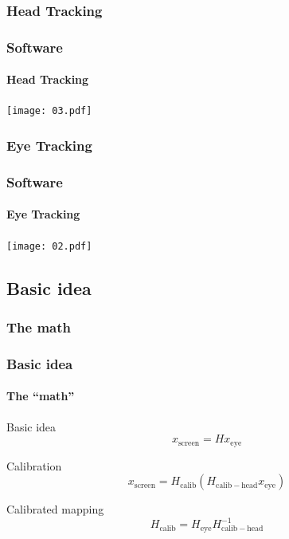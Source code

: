 \documentclass[%
14pt
]{beamer}
\begin{document}
\subsubsection{Head Tracking}
\begin{frame}
	\frametitle{Software}
  \framesubtitle{Head Tracking}
  \vspace*{-2.5cm}
  \begin{center}
    \texttt{[image: 03.pdf]}
  \end{center}
\end{frame}
\subsubsection{Eye Tracking}
\begin{frame}
	\frametitle{Software}
  \framesubtitle{Eye Tracking}
  \vspace*{-0.5cm}
  \begin{center}
    \texttt{[image: 02.pdf]}
  \end{center}
\end{frame}



\subsection{Basic idea}
\subsubsection{The math}
\begin{frame}
	\frametitle{Basic idea}
  \framesubtitle{The ``math''}
  \begin{block}{Basic idea}
    \begin{equation*}
      x_\mathrm{screen} = H x_\mathrm{eye}
    \end{equation*}
  \end{block}\pause
  \begin{block}{Calibration}
    \begin{equation*}
      x_\mathrm{screen} = H_\mathrm{calib} (H_\mathrm{calib-head} x_\mathrm{eye})
    \end{equation*}
  \end{block}\pause
  \begin{block}{Calibrated mapping}
    \begin{equation*}
      H_\mathrm{calib} = H_\mathrm{eye} H_\mathrm{calib-head} ^{-1}
    \end{equation*}
  \end{block}
\end{frame}
\end{document}

